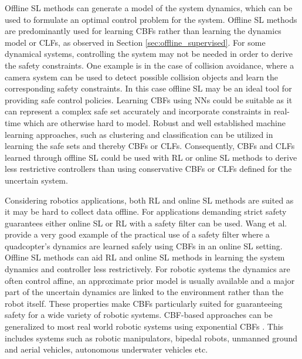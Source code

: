 \documentclass[3p,times,procedia]{elsarticle}
\begin{document}
Offline SL methods can generate a model of the system dynamics, which can be used to formulate an optimal control problem for the system. Offline SL methods are predominantly used for learning CBFs rather than learning the dynamics model or CLFs, as observed in Section \ref{sec:offline_supervised}. For some dynamical systems, controlling the system may not be needed in order to derive the safety constraints. One example is in the case of collision avoidance, where a camera system can be used to detect possible collision objects and learn the corresponding safety constraints. In this case offline SL may be an ideal tool for providing safe control policies. Learning CBFs using NNs could be suitable as it can represent a complex safe set accurately and incorporate constraints in real-time which are otherwise hard to model. Robust and well established machine learning approaches, such as clustering and classification can be utilized in learning the safe sets and thereby CBFs or CLFs. Consequently, CBFs and CLFs learned through offline SL could be used with RL or online SL methods to derive less restrictive controllers than using conservative CBFs or CLFs defined for the uncertain system.



Considering robotics applications, both RL and online SL methods are suited as it may be hard to collect data offline. For applications demanding strict safety guarantees either online SL or RL with a safety filter can be used. Wang et al. \cite{Wang2017} provide a very good example of the practical use of a safety filter where a quadcopter's dynamics are learned safely using CBFs in an online SL setting. Offline SL methods can aid RL and online SL methods in learning the system dynamics and controller less restrictively. For robotic systems the dynamics are often control affine, an approximate prior model is usually available and a major part of the uncertain dynamics are linked to the environment rather than the robot itself. These properties make CBFs particularly suited for guaranteeing safety for a wide variety of robotic systems. CBF-based approaches can be generalized to most real world robotic systems using exponential CBFs \cite{Ames2019}. This includes systems such as robotic manipulators, bipedal robots, unmanned ground and aerial vehicles, autonomous underwater vehicles etc.
\end{document}
